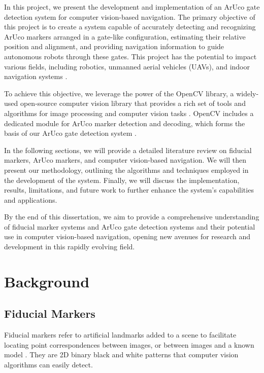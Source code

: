 \documentclass[12pt,a4paper]{report}
\def\aruco{ArUco }
\begin{document}
In this project, we present the development and implementation of an \aruco gate detection system for computer vision-based navigation. The primary objective of this project is to create a system capable of accurately detecting and recognizing ArUco markers arranged in a gate-like configuration, estimating their relative position and alignment, and providing navigation information to guide autonomous robots through these gates. This project has the potential to impact various fields, including robotics, unmanned aerial vehicles (UAVs), and indoor navigation systems \cite{boniardi2016autonomous}.

To achieve this objective, we leverage the power of the OpenCV library, a widely-used open-source computer vision library that provides a rich set of tools and algorithms for image processing and computer vision tasks \cite{bradski2008learning}. OpenCV includes a dedicated module for ArUco marker detection and decoding, which forms the basis of our ArUco gate detection system \cite{romero2018speeded}.

In the following sections, we will provide a detailed literature review on fiducial markers, ArUco markers, and computer vision-based navigation. We will then present our methodology, outlining the algorithms and techniques employed in the development of the system. Finally, we will discuss the implementation, results, limitations, and future work to further enhance the system's capabilities and applications.

By the end of this dissertation, we aim to provide a comprehensive understanding of fiducial marker systems and \aruco gate detection systems and their potential use in computer vision-based navigation, opening new avenues for research and development in this rapidly evolving field.

\chapter{Background}
\label{Chapter: Background}
\section{Fiducial Markers}
\label{sec: Fiducial Markers}
Fiducial markers refer to artificial landmarks added to a scene to facilitate locating point correspondences between images, or between images and a known model \cite{reliablefiducialmarkers}. They are 2D binary black and white patterns that computer vision algorithms can easily detect.
\end{document}
